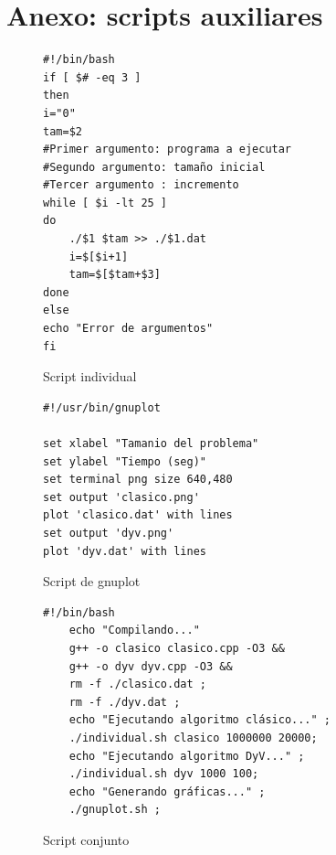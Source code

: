 \documentclass[12pt,spanish]{article}
\begin{document}
\section{Anexo: scripts auxiliares}
\label{sec:scripts}

\begin{figure}[H]
\begin{verbatim}
#!/bin/bash
if [ $# -eq 3 ]
then
i="0"
tam=$2
#Primer argumento: programa a ejecutar
#Segundo argumento: tamaño inicial
#Tercer argumento : incremento
while [ $i -lt 25 ]
do
	./$1 $tam >> ./$1.dat
	i=$[$i+1]
	tam=$[$tam+$3]
done
else
echo "Error de argumentos"
fi

\end{verbatim}
\caption{Script individual}
\end{figure}



\begin{figure}[H]
\begin{verbatim}
#!/usr/bin/gnuplot

set xlabel "Tamanio del problema"
set ylabel "Tiempo (seg)"
set terminal png size 640,480
set output 'clasico.png'
plot 'clasico.dat' with lines
set output 'dyv.png'
plot 'dyv.dat' with lines
\end{verbatim}
\caption{Script de gnuplot}
\end{figure}


\begin{figure}[H]
\begin{verbatim}
#!/bin/bash
	echo "Compilando..."
	g++ -o clasico clasico.cpp -O3 &&
	g++ -o dyv dyv.cpp -O3 &&
	rm -f ./clasico.dat ;
	rm -f ./dyv.dat ;
	echo "Ejecutando algoritmo clásico..." ;
	./individual.sh clasico 1000000 20000;
	echo "Ejecutando algoritmo DyV..." ;
	./individual.sh dyv 1000 100;
	echo "Generando gráficas..." ;
	./gnuplot.sh ;
\end{verbatim}
\caption{Script conjunto}
\end{figure}


\end{document}
